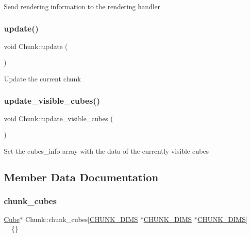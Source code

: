 Send rendering information to the rendering handler \mbox{\label{classChunk_a1cbe00cb7683d46b86908f29fe066f5b}} 
\subsubsection{\texorpdfstring{update()}{update()}}
{\footnotesize\ttfamily void Chunk\+::update (\begin{DoxyParamCaption}{ }\end{DoxyParamCaption})}

Update the current chunk \mbox{\label{classChunk_a47b3962ad57c0cceed3033f3b1eee474}} 
\subsubsection{\texorpdfstring{update\+\_\+visible\+\_\+cubes()}{update\_visible\_cubes()}}
{\footnotesize\ttfamily void Chunk\+::update\+\_\+visible\+\_\+cubes (\begin{DoxyParamCaption}{ }\end{DoxyParamCaption})\hspace{0.3cm}{\ttfamily [private]}}

Set the cubes\+\_\+info array with the data of the currently visible cubes 

\subsection{Member Data Documentation}
\mbox{\label{classChunk_aaf87542e059f3c86960e6f7b5b568daf}} 
\subsubsection{\texorpdfstring{chunk\+\_\+cubes}{chunk\_cubes}}
{\footnotesize\ttfamily \mbox{\hyperlink{classCube}{Cube}}$\ast$ Chunk\+::chunk\+\_\+cubes\mbox{[}\mbox{\hyperlink{World_8hpp_a0e16b82054c4942f52ca2e1254dcc420}{C\+H\+U\+N\+K\+\_\+\+D\+I\+MS}} $\ast$\mbox{\hyperlink{World_8hpp_a0e16b82054c4942f52ca2e1254dcc420}{C\+H\+U\+N\+K\+\_\+\+D\+I\+MS}} $\ast$\mbox{\hyperlink{World_8hpp_a0e16b82054c4942f52ca2e1254dcc420}{C\+H\+U\+N\+K\+\_\+\+D\+I\+MS}}\mbox{]} = \{\}\hspace{0.3cm}{\ttfamily [private]}}

